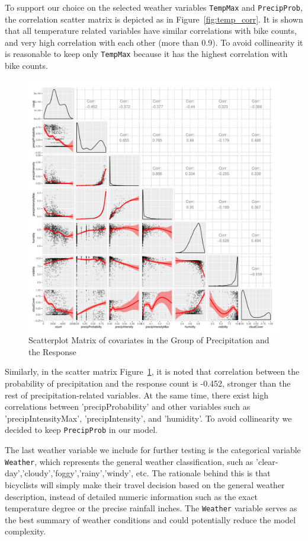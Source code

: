 \documentclass [11pt, proquest] {uwthesis}[2015/03/03]
\begin{document}
To support our choice on the selected weather variables \texttt{TempMax} and \texttt{PrecipProb}, the correlation scatter matrix is depicted as in Figure~\ref{fig:temp_corr}. It is shown that all temperature related variables have similar correlations with bike counts, and very high correlation with each other (more than 0.9). To avoid collinearity it is reasonable to keep only \texttt{TempMax} because it has the highest correlation with bike counts.  

\begin{figure}
   \includegraphics[width=1\textwidth]{figures/matrix1}
  \caption{Scatterplot Matrix of covariates in the Group of Precipitation and the Response}
  \label{fig:precip_corr}
\end{figure}

Similarly, in the scatter matrix Figure~\ref{fig:precip_corr}, it is noted that correlation between the probability of precipitation and the response count is -0.452, stronger than the rest of precipitation-related variables. At the same time, there exist high correlations between 'precipProbability' and other variables such as 'precipIntensityMax', 'precipIntensity', and 'humidity'. To avoid collinearity we decided to keep \texttt{PrecipProb} in our model.

The last weather variable we include for further testing is the categorical variable \texttt{Weather}, which represents the general weather classification, such as 'clear-day','cloudy','foggy','rainy','windy', etc. The rationale behind this is that bicyclists will simply make their travel decision based on the general weather description, instead of detailed numeric information such as the exact temperature degree or the precise rainfall inches. The \texttt{Weather} variable serves as the best summary of weather conditions and could potentially reduce the model complexity.
\end{document}

